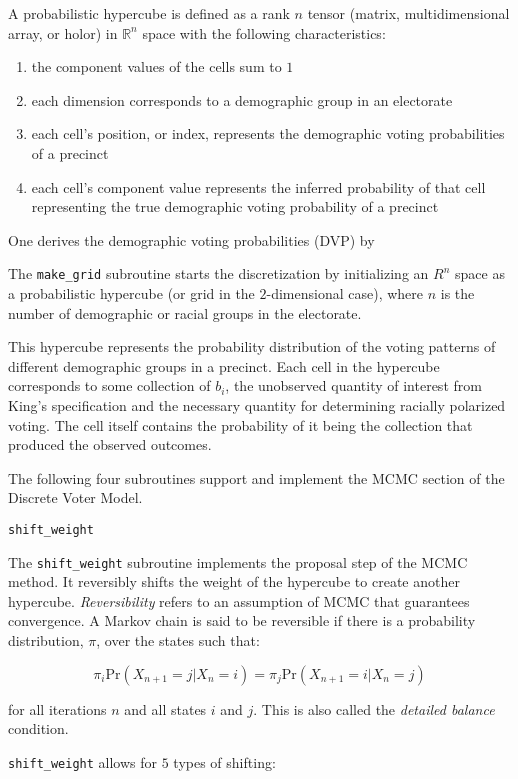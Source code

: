 A probabilistic hypercube is defined as a rank $n$ tensor (matrix, multidimensional array, or holor) in $\mathbb{R}^n$ space with the following characteristics:
\begin{enumerate}
  \item the component values of the cells sum to $1$
  \item each dimension corresponds to a demographic group in an electorate
  \item each cell's position, or index, represents the demographic voting probabilities of a precinct
  \item each cell's component value represents the inferred probability of that cell representing the true demographic voting probability of a precinct
\end{enumerate}

One derives the demographic voting probabilities (DVP) by

The \texttt{make\_grid} subroutine starts the discretization by initializing an $R^n$ space as a probabilistic hypercube (or grid in the $2$-dimensional case), where $n$ is the number of demographic or racial groups in the electorate.

This hypercube represents the probability distribution of the voting patterns of different demographic groups in a precinct. Each cell in the hypercube corresponds to some collection of $b_i$, the unobserved quantity of interest from King's specification and the necessary quantity for determining racially polarized voting. The cell itself contains the probability of it being the collection that produced the observed outcomes.

The following four subroutines support and implement the MCMC section of the Discrete Voter Model.


\texttt{shift\_weight}


The \texttt{shift\_weight} subroutine implements the proposal step of the MCMC method. It reversibly shifts the weight of the hypercube to create another hypercube. \textit{Reversibility} refers to an assumption of MCMC that guarantees convergence. A Markov chain is said to be reversible if there is a probability distribution, $\pi$, over the states such that:

$$\pi_i \text{Pr}(X_{n+1} = j | X_n = i) = \pi_j \text{Pr}(X_{n+1} = i | X_n = j)$$

for all iterations $n$ and all states $i$ and $j$. This is also called the \textit{detailed balance} condition.

\texttt{shift\_weight} allows for $5$ types of shifting:

